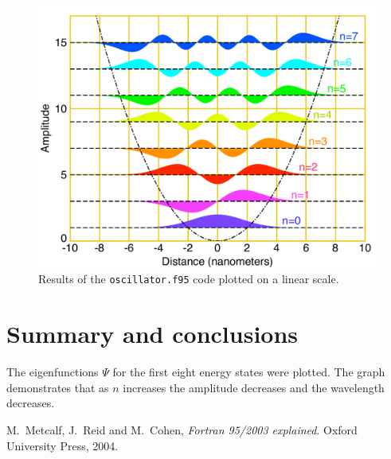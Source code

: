 \documentclass[12pt]{article}
\begin{document}
\begin{figure}[!htb]
\includegraphics[width=1.\textwidth]{quantum_oscillator.pdf}
\caption{Results of the {\tt oscillator.f95} code plotted on a linear scale. }
\label{linearscattering}
\end{figure}





\section{Summary and conclusions}

The eigenfunctions $\Psi$ for the first eight energy states were plotted. The graph demonstrates that as $n$ increases the amplitude decreases and the wavelength decreases.

\begin{thebibliography}{}


 M.\ Metcalf, J.\ Reid and M.\ Cohen, {\it Fortran 95/2003 explained}. Oxford University Press, 2004.
 

\end{thebibliography}
\end{document}

